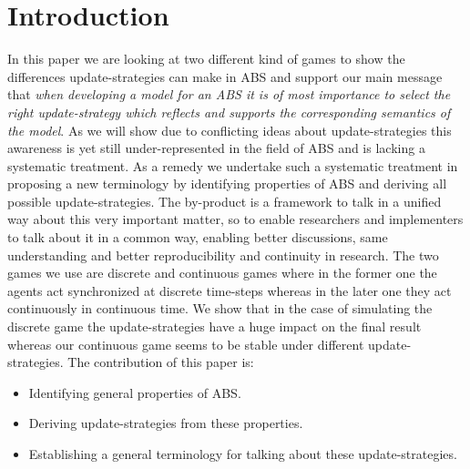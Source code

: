 \section{Introduction}
In this paper we are looking at two different kind of games to show the differences update-strategies can make in ABS and support our main message that \textit{when developing a model for an ABS it is of most importance to select the right update-strategy which reflects and supports the corresponding semantics of the model}. As we will show due to conflicting ideas about update-strategies this awareness is yet still under-represented in the field of ABS and is lacking a systematic treatment. As a remedy we undertake such a systematic treatment in proposing a new terminology by identifying properties of ABS and deriving all possible update-strategies. The by-product is a framework to talk in a unified way about this very important matter, so to enable researchers and implementers to talk about it in a common way, enabling better discussions, same understanding and better reproducibility and continuity in research.
The two games we use are discrete and continuous games where in the former one the agents act synchronized at discrete time-steps whereas in the later one they act continuously in continuous time. We show that in the case of simulating the discrete game the update-strategies have a huge impact on the final result whereas our continuous game seems to be stable under different update-strategies.
The contribution of this paper is:
\begin{itemize}
	\item Identifying general properties of ABS.
	\item Deriving update-strategies from these properties.
	\item Establishing a general terminology for talking about these update-strategies.
\end{itemize}